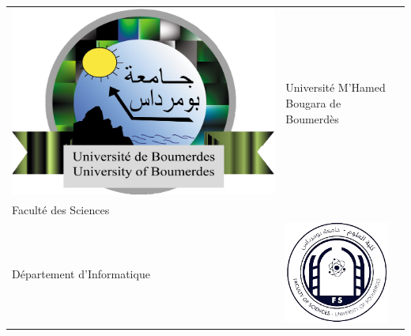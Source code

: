 \documentclass[14pt]{extarticle}
\begin{document}
\begin{titlepage}
    \begin{center}
    \begin{tabular}{m{} m{} m{}}
        \includegraphics[width=\linewidth]{umbb.png} &
        \centering
        { \small {Université M'Hamed Bougara de Boumerdès}}\\
        { \small {Faculté des Sciences}}\\
        { \small {Département d'Informatique}} &
        \includegraphics[width=\linewidth]{FS.png}
    \end{tabular}
\end{center}



\end{titlepage}
\end{document}
